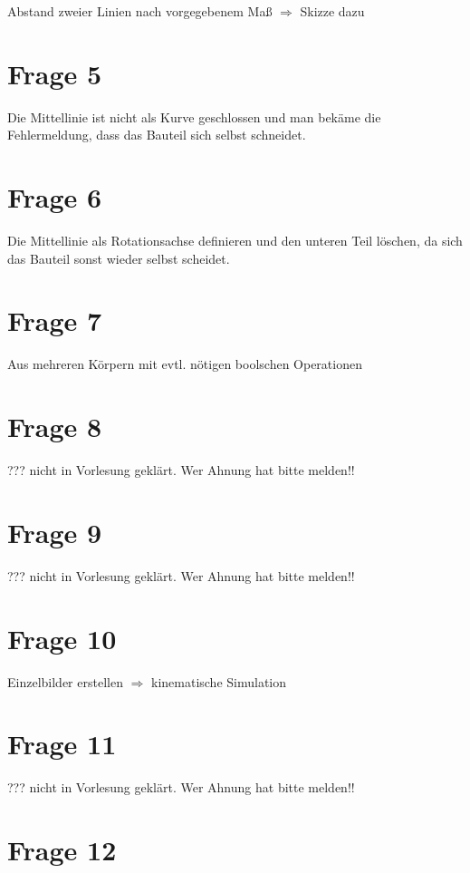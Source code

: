 Abstand zweier Linien nach vorgegebenem Maß $\Rightarrow$ Skizze dazu

\section{Frage 5}

Die Mittellinie ist nicht als Kurve geschlossen und man bekäme die Fehlermeldung, dass das Bauteil sich selbst schneidet.

\section{Frage 6}

Die Mittellinie als Rotationsachse definieren und den unteren Teil löschen, da sich das Bauteil sonst wieder selbst scheidet.

\section{Frage 7}

Aus mehreren Körpern mit evtl. nötigen boolschen Operationen

\section{Frage 8}

??? nicht in Vorlesung geklärt. Wer Ahnung hat bitte melden!!

\section{Frage 9}

??? nicht in Vorlesung geklärt. Wer Ahnung hat bitte melden!!

\section{Frage 10}

Einzelbilder erstellen $\Rightarrow$ kinematische Simulation


\section{Frage 11}

??? nicht in Vorlesung geklärt. Wer Ahnung hat bitte melden!!

\section{Frage 12}

